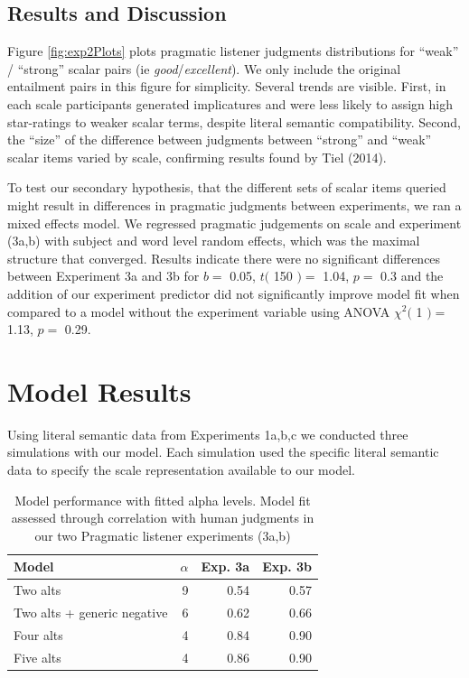 \documentclass[10pt, letterpaper]{article}
\begin{document}
\subsection{Results and Discussion}\label{results-and-discussion-2}

Figure \ref{fig:exp2Plots} plots pragmatic listener judgments
distributions for ``weak'' / ``strong'' scalar pairs (ie
\emph{good}/\emph{excellent}). We only include the original entailment
pairs in this figure for simplicity. Several trends are visible. First,
in each scale participants generated implicatures and were less likely
to assign high star-ratings to weaker scalar terms, despite literal
semantic compatibility. Second, the ``size'' of the difference between
judgments between ``strong'' and ``weak'' scalar items varied by scale,
confirming results found by Tiel (2014).

To test our secondary hypothesis, that the different sets of scalar
items queried might result in differences in pragmatic judgments between
experiments, we ran a mixed effects model. We regressed pragmatic
judgements on scale and experiment (3a,b) with subject and word level
random effects, which was the maximal structure that converged. Results
indicate there were no significant differences between Experiment 3a and
3b for \(b =\) 0.05, \(t(\) 150 \() =\) 1.04, \(p =\) 0.3 and the
addition of our experiment predictor did not significantly improve model
fit when compared to a model without the experiment variable using ANOVA
\(\chi^2(\) 1 \() =\) 1.13, \(p =\) 0.29.

\section{Model Results}\label{model-results}

Using literal semantic data from Experiments 1a,b,c we conducted three
simulations with our model. Each simulation used the specific literal
semantic data to specify the scale representation available to our
model.

\begin{table}[ht]
\centering
\begin{tabular}{lrrr}
  \hline
Model & $\alpha$ & Exp. 3a & Exp. 3b \\ 
  \hline
Two alts &   9 & 0.54 & 0.57 \\ 
  Two alts + generic negative  &   6 & 0.62 & 0.66 \\ 
  Four alts &   4 & 0.84 & 0.90 \\ 
  Five alts &   4 & 0.86 & 0.90 \\ 
   \hline
\end{tabular}
\caption{Model performance with fitted alpha levels. Model fit assessed through correlation with human judgments in our two Pragmatic listener experiments (3a,b)} 
\end{table}
\end{document}
